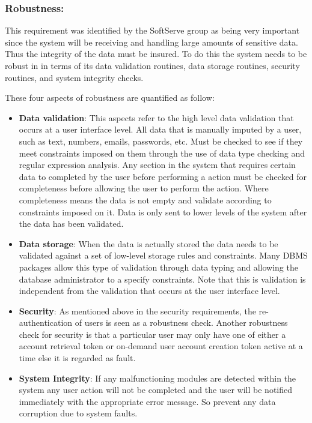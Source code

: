 \subsubsection{Robustness:}

\begin{flushleft}

This requirement was identified by the SoftServe group as being very important since the system will be receiving and handling large amounts of sensitive data. Thus the integrity of the data must be insured. To do this the system needs to be robust in in terms of its data validation routines, data storage routines, security routines, and system integrity checks. 

These four aspects of robustness are quantified as follow:
\begin{itemize}
\item \textbf{Data validation}: This aspects refer to the high level data validation that occurs at a user interface level. All data that is manually imputed by a user, such as text, numbers, emails, passwords, etc. Must be checked to see if they meet constraints imposed on them through the use of data type checking and regular expression analysis. Any section in the system that requires certain data to completed by the user before performing a action must be checked for completeness before allowing the user to perform the action. Where completeness means the data is not empty and validate according to constraints imposed on it. Data is only sent to lower levels of the system after the data has been validated.
\item \textbf{Data storage}: When the data is actually stored the data needs to be validated against a set of low-level storage rules and constraints. Many DBMS packages allow this type of validation through data typing and allowing the database administrator to a specify constraints. Note that this is validation is independent from the validation that occurs at the user interface level.
\item \textbf{Security}: As mentioned above in the security requirements, the re-authentication of users is seen as a robustness check. Another robustness check for security is that a particular user may only have one of either a account retrieval token or on-demand user account creation token active at a time else it is regarded as fault.
\item \textbf{System Integrity}: If any malfunctioning modules are detected within the system any user action will not be completed and the user will be notified immediately with the appropriate error message. So prevent any data corruption due to system faults.
\end{itemize}


\end{flushleft}
